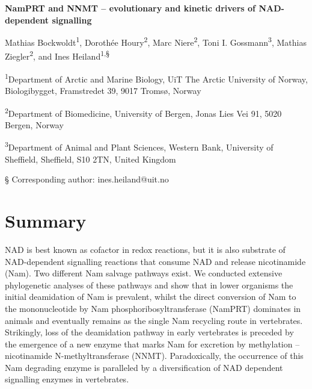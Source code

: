 
\noindent
{\huge\sffamily\bfseries NamPRT and NNMT – evolutionary and kinetic drivers of NAD-dependent signalling \par}

\vspace{5mm}

\noindent
Mathias Bockwoldt\textsuperscript{1}, Dorothée Houry\textsuperscript{2}, Marc Niere\textsuperscript{2}, Toni I. Gossmann\textsuperscript{3}, Mathias Ziegler\textsuperscript{2}, and Ines Heiland\textsuperscript{1,§}

\vspace{1cm}

\noindent
\textsuperscript{1}Department of Arctic and Marine Biology, UiT The Arctic University of Norway, Biologibygget, Framstredet 39, 9017 Tromsø, Norway

\noindent
\textsuperscript{2}Department of Biomedicine, University of Bergen, Jonas Lies Vei 91, 5020 Bergen, Norway

\noindent
\textsuperscript{3}Department of Animal and Plant Sciences, Western Bank, University of Sheffield, Sheffield, S10 2TN, United Kingdom

\noindent
§ Corresponding author: ines.heiland@uit.no


\section*{Summary}

NAD is best known as cofactor in redox reactions, but it is also substrate of NAD-dependent signalling reactions that consume NAD and release nicotinamide (Nam). Two different Nam salvage pathways exist. We conducted extensive phylogenetic analyses of these pathways and show that in lower organisms the initial deamidation of Nam is prevalent, whilst the direct conversion of Nam to the mononucleotide by Nam phosphoribosyltransferase (NamPRT) dominates in animals and eventually remains as the single Nam recycling route in vertebrates. Strikingly, loss of the deamidation pathway in early vertebrates is preceded by the emergence of a new enzyme that marks Nam for excretion by methylation – nicotinamide N-methyltransferase (NNMT). Paradoxically, the occurrence of this Nam degrading enzyme is paralleled by a diversification of NAD dependent signalling enzymes in vertebrates.

